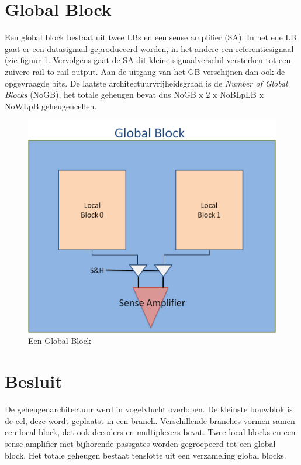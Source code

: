 \section{Global Block}
\label{globalblock}
Een global block bestaat uit twee LBs en een sense amplifier (SA). In het ene LB gaat er een datasignaal geproduceerd worden, in het andere een referentiesignaal (zie figuur \ref{fig:GB}. Vervolgens gaat de SA dit kleine signaalverschil versterken tot een zuivere rail-to-rail output.
Aan de uitgang van het GB verschijnen dan ook de opgevraagde bits.
De laatste architectuurvrijheidsgraad is de \emph{Number of Global Blocks} (NoGB), het totale geheugen bevat dus NoGB x 2 x NoBLpLB x NoWLpB geheugencellen.

\begin{figure}
  \centering
  \includegraphics[scale=0.3]{../fig/hfdstk-architecture-globalblock.png}
  \caption{Een Global Block}
  \label{fig:GB}
\end{figure}

\section{Besluit}
De geheugenarchitectuur werd in vogelvlucht overlopen. De kleinste bouwblok is de cel, deze wordt geplaatst in een branch. Verschillende branches vormen samen een local block, dat ook decoders en multiplexers bevat. Twee local blocks en een sense amplifier met bijhorende passgates worden gegroepeerd tot een global block. Het totale geheugen bestaat tenslotte uit een verzameling global blocks.

